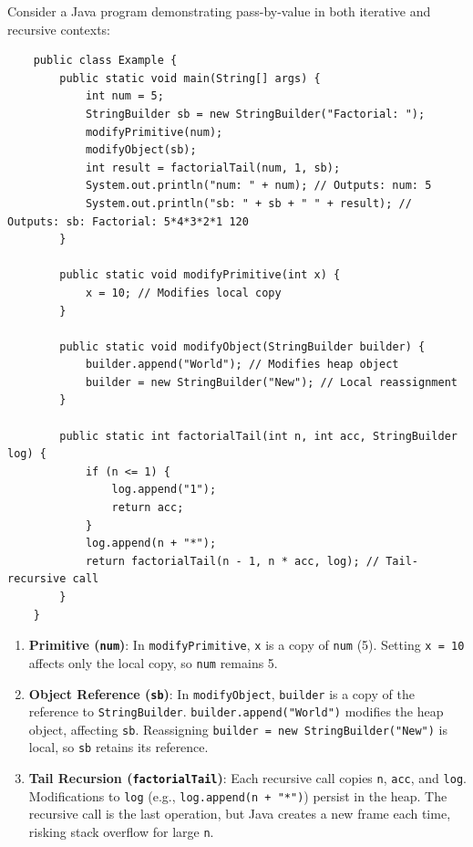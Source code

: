 \documentclass{article}
\begin{document}
Consider a Java program demonstrating pass-by-value in both iterative and recursive contexts:
\begin{lstlisting}
	public class Example {
		public static void main(String[] args) {
			int num = 5;
			StringBuilder sb = new StringBuilder("Factorial: ");
			modifyPrimitive(num);
			modifyObject(sb);
			int result = factorialTail(num, 1, sb);
			System.out.println("num: " + num); // Outputs: num: 5
			System.out.println("sb: " + sb + " " + result); // Outputs: sb: Factorial: 5*4*3*2*1 120
		}
		
		public static void modifyPrimitive(int x) {
			x = 10; // Modifies local copy
		}
		
		public static void modifyObject(StringBuilder builder) {
			builder.append("World"); // Modifies heap object
			builder = new StringBuilder("New"); // Local reassignment
		}
		
		public static int factorialTail(int n, int acc, StringBuilder log) {
			if (n <= 1) {
				log.append("1");
				return acc;
			}
			log.append(n + "*");
			return factorialTail(n - 1, n * acc, log); // Tail-recursive call
		}
	}
\end{lstlisting}
\begin{enumerate}
	\item \textbf{Primitive (\texttt{num})}: In \texttt{modifyPrimitive}, \texttt{x} is a copy of \texttt{num} (5). Setting \texttt{x = 10} affects only the local copy, so \texttt{num} remains 5.
	\item \textbf{Object Reference (\texttt{sb})}: In \texttt{modifyObject}, \texttt{builder} is a copy of the reference to \texttt{StringBuilder}. \texttt{builder.append("World")} modifies the heap object, affecting \texttt{sb}. Reassigning \texttt{builder = new StringBuilder("New")} is local, so \texttt{sb} retains its reference.
	\item \textbf{Tail Recursion (\texttt{factorialTail})}: Each recursive call copies \texttt{n}, \texttt{acc}, and \texttt{log}. Modifications to \texttt{log} (e.g., \texttt{log.append(n + "*")}) persist in the heap. The recursive call is the last operation, but Java creates a new frame each time, risking stack overflow for large \texttt{n}.
\end{enumerate}

\end{document}
